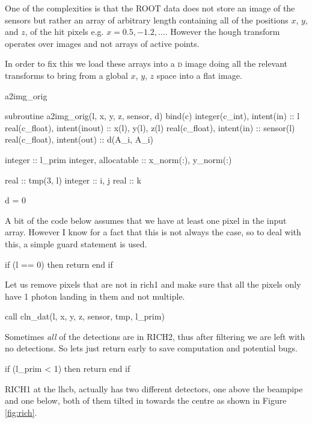 \documentclass[10pt, a4paper]{article}
\begin{document}
One of the complexities is that the ROOT data does not store an image of the sensors but rather an array of arbitrary length containing all of the positions $x$, $y$, and $z$, of the hit pixels e.g. $x = {0.5, -1.2, ...}$. However the hough transform operates over images and not arrays of active points.

In order to fix this we load these arrays into a \textsc{d} image doing all the relevant transforms to bring from a global $x$, $y$, $z$ space into a flat image. 

\begin{codeblock}{a2img_orig}
\begin{code}
subroutine a2img_orig(l, x, y, z, sensor, d) bind(c)
	integer(c_int), intent(in)  :: l
	real(c_float),  intent(inout)  :: x(l), y(l), z(l)
	real(c_float),  intent(in)  :: sensor(l)
	real(c_float),  intent(out) :: d(A_i, A_i)
	
	integer :: l_prim
	integer, allocatable :: x_norm(:), y_norm(:)
	
	real :: tmp(3, l) 
	integer :: i, j
	real :: k
	
	d = 0
\end{code}

A bit of the code below assumes that we have at least one pixel in the input array. 
However I know for a fact that this is not always the case, so to deal with this, a simple guard statement is used. 

\begin{code}
	if (l == 0) then 
		return 
	end if 
\end{code}

Let us remove pixels that are not in rich1 and make sure that all the pixels only have 1 photon landing in them and not multiple. 

\begin{code}
	call cln_dat(l, x, y, z, sensor, tmp, l_prim)
\end{code}

Sometimes \emph{all} of the detections are in RICH2, thus after filtering we are left with no detections. So lets just return early to save computation and potential bugs. 

\begin{code}
	if (l_prim < 1) then 
		return 
	end if 
\end{code}

RICH1 at the lhcb, actually has two different detectors, one above the beampipe and one below, both of them tilted in towards the centre as shown in Figure \ref{fig:rich}.


\end{codeblock}
\end{document}
